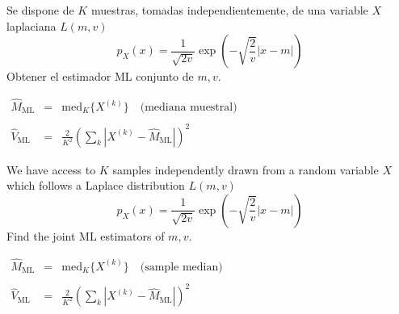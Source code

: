 \ifspanish

\question Se dispone de $K$ muestras, tomadas independientemente, de una variable $X$ laplaciana $L(m,v)$
\[
  p_X(x) = \frac{1}{\sqrt{2v}} \exp \left( - \sqrt{\frac{2}{v}} |x - m| \right)
\]
Obtener el estimador ML conjunto de $m,v$.

\begin{solution}
  $\begin{array}{lll}\displaystyle
     \hat M_\text{ML} & = &{\mbox{med}}_K \{ X^{(k)}\} \quad {\mbox{(mediana muestral)}} \\
	 & & \\ \displaystyle
     \hat V_\text{ML} & = & \displaystyle\frac{2}{K^2} \left( \sum_k | X^{(k)} - \hat M_\text{ML}| \right)^2
   \end{array}$	 
\end{solution}

\else

\question We have access to $K$ samples independently drawn from a random variable $X$ which follows a Laplace distribution $L(m,v)$
\[
  p_X(x) = \frac{1}{\sqrt{2v}} \exp \left( - \sqrt{\frac{2}{v}} |x - m| \right)
\]
Find the joint ML estimators of $m,v$.

\begin{solution}  $\begin{array}{lll}\displaystyle
     \hat M_\text{ML} & = &{\mbox{med}}_K \{ X^{(k)}\} \quad {\mbox{(sample median)}} \\
	 & & \\ \displaystyle
     \hat V_\text{ML} & = & \displaystyle\frac{2}{K^2} \left( \sum_k | X^{(k)} - \hat M_\text{ML}| \right)^2
   \end{array}$	
   \end{solution}

\fi